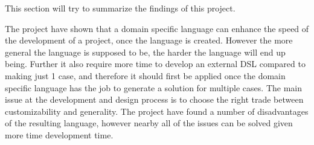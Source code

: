 This section will try to summarize the findings of this project.

The project have shown that a domain specific language can enhance the speed of the development
of a project, once the language is created. However the more general the language is supposed to
be, the harder the language will end up being. Further it also require more time to develop an
external DSL compared to making just 1 case, and therefore it should first be applied once the
domain specific language has the job to generate a solution for multiple cases.
The main issue at the development and design process is to choose the right trade between
customizability and generality.
The project have found a number of disadvantages of the resulting language, however nearby all of
the issues can be solved given more time development time.


